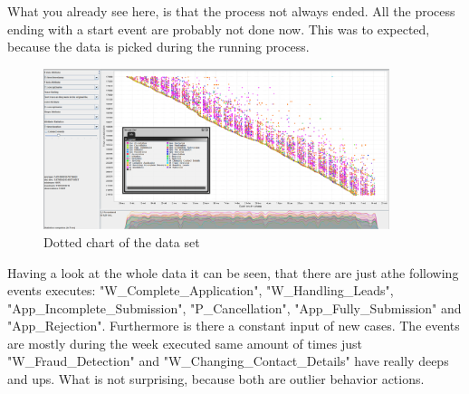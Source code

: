 What you already see here, is that the process not always ended. All the process ending with a start event are probably not done now. This was to expected, because the data is picked during the running process.


\begin{figure}[!htbp]
\centering
\includegraphics[width = 0.9\textwidth]{TotalDataDot.PNG}
\caption{Dotted chart of the data set}
\label{fig:WholeDat}
\end{figure}

Having a look at the whole data it can be seen, that there are just athe following events executes: "W\_Complete\_Application", "W\_Handling\_Leads", "App\_Incomplete\_Submission", "P\_Cancellation", "App\_Fully\_Submission" and "App\_Rejection". Furthermore is there a constant input of new cases. The events are mostly during the week executed same amount of times just "W\_Fraud\_Detection" and "W\_Changing\_Contact\_Details" have really deeps and ups. What is not surprising, because both are outlier behavior actions.